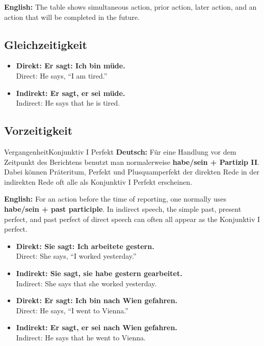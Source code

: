\documentclass[a4paper,11pt]{article}
\newcommand{\GermanText}[1]{\textbf{Deutsch: }#1\par}
\newcommand{\EnglishText}[1]{{\small\color{SoftGray}\textbf{English: }#1\par}}
\newcommand{\ExampleItem}[2]{\item \textbf{#1}\\{\small\color{SoftGray}#2}}
\begin{document}
        \EnglishText{The table shows simultaneous action, prior action, later action, and an action that will be completed in the future.}

        \subsection{Gleichzeitigkeit}

            \begin{exbox}
                \begin{itemize}
                    \ExampleItem{Direkt: Er sagt: \glqq Ich bin müde.\grqq}{Direct: He says, ``I am tired.''}
                    \ExampleItem{Indirekt: Er sagt, er sei müde.}{Indirect: He says that he is tired.}
                \end{itemize}
            \end{exbox}

        \subsection{Vorzeitigkeit}

            \begin{grammarentry}{Vergangenheit}{Konjunktiv I Perfekt}
                \GermanText{Für eine Handlung vor dem Zeitpunkt des Berichtens benutzt man normalerweise \textbf{habe/sein + Partizip II}. Dabei können Präteritum, Perfekt und Plusquamperfekt der direkten Rede in der indirekten Rede oft alle als Konjunktiv I Perfekt erscheinen.}
                \EnglishText{For an action before the time of reporting, one normally uses \textbf{habe/sein + past participle}. In indirect speech, the simple past, present perfect, and past perfect of direct speech can often all appear as the Konjunktiv I perfect.}
            \end{grammarentry}

            \begin{exbox}
                \begin{itemize}
                    \ExampleItem{Direkt: Sie sagt: \glqq Ich arbeitete gestern.\grqq}{Direct: She says, ``I worked yesterday.''}
                    \ExampleItem{Indirekt: Sie sagt, sie habe gestern gearbeitet.}{Indirect: She says that she worked yesterday.}
                    \ExampleItem{Direkt: Er sagt: \glqq Ich bin nach Wien gefahren.\grqq}{Direct: He says, ``I went to Vienna.''}
                    \ExampleItem{Indirekt: Er sagt, er sei nach Wien gefahren.}{Indirect: He says that he went to Vienna.}
                \end{itemize}
            \end{exbox}
\end{document}
